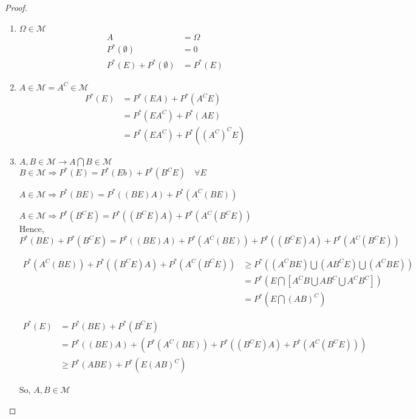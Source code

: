 \documentclass[11pt,fleqn]{book} %
\begin{document}
\begin{proof}


\begin{enumerate}[label = (\roman*)]
	\item $\Omega \in \mathcal{M}$\\

	$$\begin{aligned}
			A &= \Omega\\
			P^*(\emptyset) &= 0\\
			P^*(E) + P^*(\emptyset) &= P^*(E)
		\end{aligned}$$

	\item $A \in \mathcal{M} = A^C \in \mathcal{M}$\\

	$$\begin{aligned}
		P^*(E) &= P^*(EA) + P^*(A^C E)\\
		&= P^*(EA^C) + P^*(A E)\\
		&= P^*(EA^C) + P^*((A^C)^C E)
	\end{aligned}$$

	\item $A, B \in \mathcal{M} \rightarrow A \bigcap B \in \mathcal{M}$\\

	$B \in \mathcal{M} \Rightarrow P^*(E) = P^*(Eb) + P^*(B^C E) \quad \forall E$

	$A \in \mathcal{M} \Rightarrow P^*(BE) = P^*((BE)A) + P^*(A^C (BE))$

	$A \in \mathcal{M} \Rightarrow P^*(B^CE) = P^*((B^CE)A) + P^*(A^C (B^CE))$\\

	Hence, \\
	
	$$P^*(BE) + P^*(B^CE) = P^*((BE)A) + P^*(A^C (BE)) + P^*((B^CE)A) + P^*(A^C (B^CE))$$

	$$\begin{aligned}
		P^*(A^C (BE)) + P^*((B^CE)A) + P^*(A^C (B^CE)) &\geq P^*((A^C BE) \bigcup (AB^CE)\bigcup(A^CBE))\\
			&= P^*(E\bigcap[A^CB\bigcup  AB^C\bigcup A^CB^C])\\
			&= P^*(E \bigcap (AB)^C)
	\end{aligned} $$

	$$\begin{aligned}
		P^*(E) &= P^*(BE) + P^*(B^CE)\\
		&= P^*((BE)A) + (P^*(A^C (BE)) + P^*((B^CE)A) + P^*(A^C (B^CE)))\\
		&\geq P^*(ABE) + P^*(E(AB)^C)
	\end{aligned} $$
	
	 

	So, $A,B \in \mathcal{M}$
\end{enumerate}
\end{proof}
\end{document}
